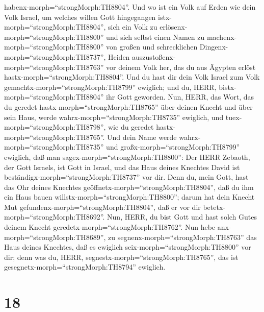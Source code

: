 habenx-morph=``strongMorph:TH8804''.  Und wo ist ein Volk
auf Erden wie dein Volk Israel, um welches willen Gott hingegangen
istx-morph=``strongMorph:TH8804'', sich ein Volk zu
erlösenx-morph=``strongMorph:TH8800'' und sich selbst einen Namen zu
machenx-morph=``strongMorph:TH8800'' von großen und schrecklichen
Dingenx-morph=``strongMorph:TH8737'', Heiden
auszustoßenx-morph=``strongMorph:TH8763'' vor deinem Volk her, das du
aus Ägypten erlöst hastx-morph=``strongMorph:TH8804''.  Und
du hast dir dein Volk Israel zum Volk
gemachtx-morph=``strongMorph:TH8799'' ewiglich; und du, HERR,
bistx-morph=``strongMorph:TH8804'' ihr Gott geworden.  Nun,
HERR, das Wort, das du geredet hastx-morph=``strongMorph:TH8765'' über
deinen Knecht und über sein Haus, werde
wahrx-morph=``strongMorph:TH8735'' ewiglich, und
tuex-morph=``strongMorph:TH8798'', wie du geredet
hastx-morph=``strongMorph:TH8765''.  Und dein Name werde
wahrx-morph=``strongMorph:TH8735'' und
großx-morph=``strongMorph:TH8799'' ewiglich, daß man
sagex-morph=``strongMorph:TH8800'': Der HERR Zebaoth, der Gott Israels,
ist Gott in Israel, und das Haus deines Knechtes David ist
beständigx-morph=``strongMorph:TH8737'' vor dir.  Denn du,
mein Gott, hast das Ohr deines Knechtes
geöffnetx-morph=``strongMorph:TH8804'', daß du ihm ein Haus bauen
willstx-morph=``strongMorph:TH8800''; darum hat dein Knecht Mut
gefundenx-morph=``strongMorph:TH8804'', daß er vor dir
betetx-morph=``strongMorph:TH8692''.  Nun, HERR, du bist
Gott und hast solch Gutes deinem Knecht
geredetx-morph=``strongMorph:TH8762''.  Nun hebe
anx-morph=``strongMorph:TH8689'', zu
segnenx-morph=``strongMorph:TH8763'' das Haus deines Knechtes, daß es
ewiglich seix-morph=``strongMorph:TH8800'' vor dir; denn was du, HERR,
segnestx-morph=``strongMorph:TH8765'', das ist
gesegnetx-morph=``strongMorph:TH8794'' ewiglich.

\hypertarget{section-17}{%
\section{18}\label{section-17}}

